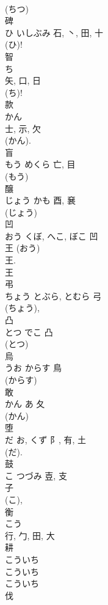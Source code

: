 \documentclass[8pt]{extreport}
\begin{document}
\begin{CJK}{UTF8}{min}
\\	(ちつ) 
\\	碑	
\\	ひ	いしぶみ	石, 丶, 田, 十	
\\	(ひ)! 
\\	智	
\\	ち	
\\	矢, 口, 日	
\\	(ち)! 
\\	款	
\\	かん	
\\	士, 示, 欠	
\\	(かん).	
\\	盲	
\\	もう	めくら	亡, 目	
\\	(もう) 
\\	醸	
\\	じょう	かも	酉, 㐮	
\\	(じょう) 
\\	凹	
\\	おう	くぼ, へこ, ぼこ	凹	
\\	王 (おう) 
\\	王. 
\\	王
\\	弔	
\\	ちょう	とぶら, とむら	弓		
\\	(ちょう), 
\\	凸	
\\	とつ	でこ	凸	
\\	(とつ) 
\\	烏	
\\	うお	からす	鳥	
\\	(からす) 
\\	敢	
\\	かん	あ	夂		
\\	(かん) 
\\	堕	
\\	だ	お, くず	阝, 有, 土	
\\	(だ). 
\\	鼓	
\\	こ	つづみ	壴, 支	
\\	子
\\	(こ), 
\\	衡	
\\	こう	
\\	行, 勹, 田, 大	
\\	耕
\\	こういち 
\\	こういち
\\	こういち 
\\	伐	

\end{CJK}
\end{document}
